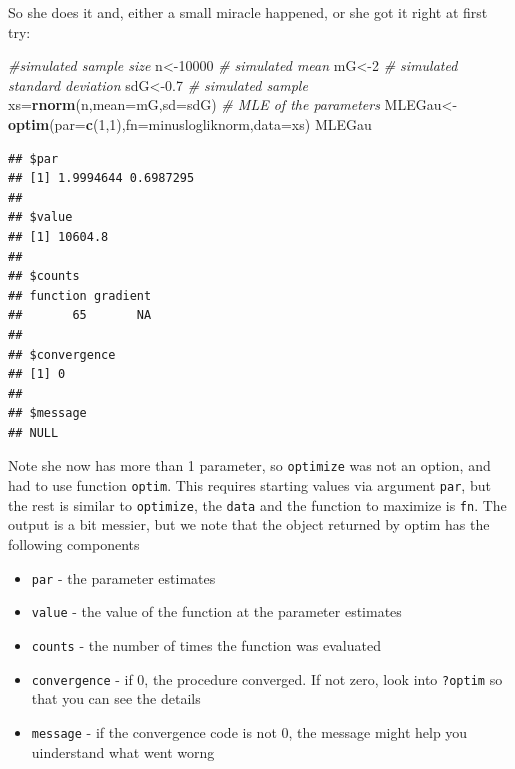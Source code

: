 \documentclass[
]{book}
\newenvironment{Shaded}{\begin{snugshade}}{\end{snugshade}}
\newcommand{\AttributeTok}[1]{\textcolor[rgb]{0.13,0.29,0.53}{#1}}
\newcommand{\CommentTok}[1]{\textcolor[rgb]{0.56,0.35,0.01}{\textit{#1}}}
\newcommand{\DecValTok}[1]{\textcolor[rgb]{0.00,0.00,0.81}{#1}}
\newcommand{\FloatTok}[1]{\textcolor[rgb]{0.00,0.00,0.81}{#1}}
\newcommand{\FunctionTok}[1]{\textcolor[rgb]{0.13,0.29,0.53}{\textbf{#1}}}
\newcommand{\NormalTok}[1]{#1}
\newcommand{\OtherTok}[1]{\textcolor[rgb]{0.56,0.35,0.01}{#1}}
\providecommand{\tightlist}{%
  \setlength{\itemsep}{0pt}\setlength{\parskip}{0pt}}
\begin{document}
So she does it and, either a small miracle happened, or she got it right at first try:

\begin{Shaded}
\begin{Highlighting}[]
\CommentTok{\#simulated sample size}
\NormalTok{n}\OtherTok{\textless{}{-}}\DecValTok{10000}
\CommentTok{\# simulated mean}
\NormalTok{mG}\OtherTok{\textless{}{-}}\DecValTok{2}
\CommentTok{\# simulated standard deviation}
\NormalTok{sdG}\OtherTok{\textless{}{-}}\FloatTok{0.7}
\CommentTok{\# simulated sample}
\NormalTok{xs}\OtherTok{=}\FunctionTok{rnorm}\NormalTok{(n,}\AttributeTok{mean=}\NormalTok{mG,}\AttributeTok{sd=}\NormalTok{sdG)}
\CommentTok{\# MLE of the parameters}
\NormalTok{MLEGau}\OtherTok{\textless{}{-}}\FunctionTok{optim}\NormalTok{(}\AttributeTok{par=}\FunctionTok{c}\NormalTok{(}\DecValTok{1}\NormalTok{,}\DecValTok{1}\NormalTok{),}\AttributeTok{fn=}\NormalTok{minuslogliknorm,}\AttributeTok{data=}\NormalTok{xs)}
\NormalTok{MLEGau}
\end{Highlighting}
\end{Shaded}

\begin{verbatim}
## $par
## [1] 1.9994644 0.6987295
## 
## $value
## [1] 10604.8
## 
## $counts
## function gradient 
##       65       NA 
## 
## $convergence
## [1] 0
## 
## $message
## NULL
\end{verbatim}

Note she now has more than 1 parameter, so \texttt{optimize} was not an option, and had to use function \texttt{optim}. This requires starting values via argument \texttt{par}, but the rest is similar to \texttt{optimize}, the \texttt{data} and the function to maximize is \texttt{fn}. The output is a bit messier, but we note that the object returned by optim has the following components

\begin{itemize}
\tightlist
\item
  \texttt{par} - the parameter estimates
\item
  \texttt{value} - the value of the function at the parameter estimates
\item
  \texttt{counts} - the number of times the function was evaluated
\item
  \texttt{convergence} - if 0, the procedure converged. If not zero, look into \texttt{?optim} so that you can see the details
\item
  \texttt{message} - if the convergence code is not 0, the message might help you uinderstand what went worng
\end{itemize}
\end{document}

